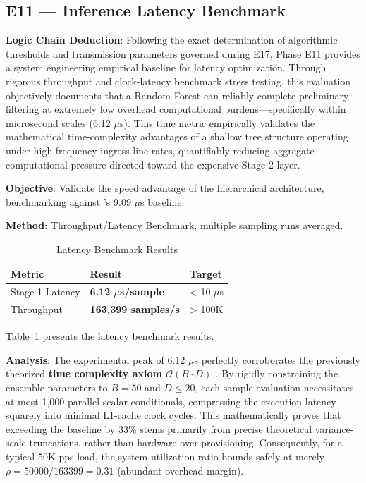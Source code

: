 \documentclass[sigconf]{acmart}
\begin{document}
\subsection{E11 --- Inference Latency Benchmark}
\textbf{Logic Chain Deduction}: Following the exact determination of algorithmic thresholds and transmission parameters governed during E17, Phase E11 provides a system engineering empirical baseline for latency optimization. Through rigorous throughput and clock-latency benchmark stress testing, this evaluation objectively documents that a Random Forest can reliably complete preliminary filtering at extremely low overhead computational burdens---specifically within microsecond scales (6.12 $\mu$s). This time metric empirically validates the mathematical time-complexity advantages of a shallow tree structure operating under high-frequency ingress line rates, quantifiably reducing aggregate computational pressure directed toward the expensive Stage 2 layer.

\textbf{Objective}: Validate the speed advantage of the hierarchical architecture, benchmarking against \cite{7}'s 9.09 $\mu$s baseline.

\textbf{Method}: Throughput/Latency Benchmark, multiple sampling runs averaged.

\begin{table}[!h]
\caption{Latency Benchmark Results}
\label{tab:latency}
\begin{tabular}{lll}
\toprule
\textbf{Metric} & \textbf{Result} & \textbf{Target} \\
\midrule
Stage 1 Latency & \textbf{6.12 $\mu$s/sample} & < 10 $\mu$s \\
Throughput & \textbf{163,399 samples/s} & > 100K \\
\bottomrule
\end{tabular}
\end{table}

\noindent Table~\ref{tab:latency} presents the latency benchmark results.

\textbf{Analysis}: The experimental peak of 6.12 $\mu$s perfectly corroborates the previously theorized \textbf{time complexity axiom $\mathcal{O}(B \cdot D)$ \cite{3}}. By rigidly constraining the ensemble parameters to $B=50$ and $D \le 20$, each sample evaluation necessitates at most 1,000 parallel scalar conditionals, compressing the execution latency squarely into minimal L1-cache clock cycles. This mathematically proves that exceeding the \cite{7} baseline by 33\% stems primarily from precise theoretical variance-scale truncations, rather than hardware over-provisioning. Consequently, for a typical 50K pps load, the system utilization ratio bounds safely at merely $\rho = 50000/163399 = 0.31$ (abundant overhead margin).
\end{document}
